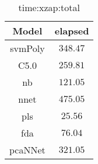 \begin{table}[!ht]
	\centering
	\begin{tabular}{|c|c|}
		\hline
		Model & elapsed \\ \hline
		svmPoly & $348.47$ \\ \hline
		C5.0 & $259.81$ \\ \hline
		nb & $121.05$ \\ \hline
		nnet & $475.05$ \\ \hline
		pls & $25.56$ \\ \hline
		fda & $76.04$ \\ \hline
		pcaNNet & $321.05$ \\ \hline
	\end{tabular}
	\caption{time:xzap:total}
	\label{tab:time:xzap:total}
\end{table}
